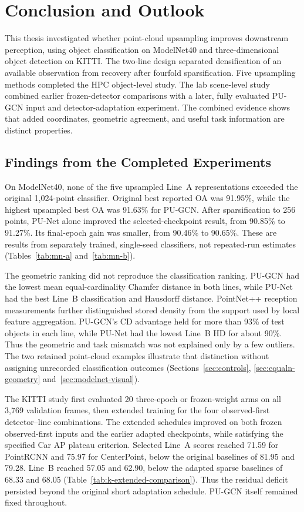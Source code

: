 \chapter{Conclusion and Outlook}\label{chap:conclusion}

This thesis investigated whether point-cloud upsampling improves downstream
perception, using object classification on ModelNet40 and three-dimensional
object detection on KITTI. The two-line design separated densification of
an available observation from recovery after fourfold sparsification.
Five upsampling methods completed the HPC object-level study. The lab
scene-level study combined earlier frozen-detector comparisons with a
later, fully evaluated PU-GCN input and detector-adaptation experiment.
The combined evidence shows that added coordinates, geometric agreement,
and useful task information are distinct properties.

\section{Findings from the Completed Experiments}

On ModelNet40, none of the five upsampled Line~A representations exceeded
the original 1,024-point classifier. Original best reported OA was 91.95\%, while
the highest upsampled best OA was 91.63\% for PU-GCN. After sparsification
to 256 points, PU-Net alone improved the selected-checkpoint result,
from 90.85\% to 91.27\%. Its final-epoch gain was smaller, from 90.46\%
to 90.65\%. These are results from separately trained, single-seed
classifiers, not repeated-run estimates
(Tables~\ref{tab:mn-a} and~\ref{tab:mn-b}).

The geometric ranking did not reproduce the classification ranking.
PU-GCN had the lowest mean equal-cardinality Chamfer distance in both
lines, while PU-Net had the best Line~B classification and Hausdorff
distance. PointNet++ reception measurements further distinguished
stored density from the support used by local feature aggregation.
PU-GCN's CD advantage held for more than 93\% of test objects in
each line, while PU-Net had the lowest Line~B HD for about 90\%.
Thus the geometric and task mismatch was not explained only by a few
outliers. The two retained point-cloud examples illustrate that
distinction without assigning unrecorded classification outcomes
(Sections~\ref{sec:controls}, \ref{sec:equaln-geometry}
and~\ref{sec:modelnet-visual}).

The KITTI study first evaluated 20 three-epoch or frozen-weight arms
on all 3,769 validation frames, then extended training for the four
observed-first detector--line combinations. The extended schedules
improved on both frozen observed-first inputs and the earlier adapted
checkpoints, while satisfying the specified Car AP plateau criterion.
Selected Line~A scores reached 71.59 for PointRCNN and 75.97 for
CenterPoint, below the original baselines of 81.95 and 79.28.
Line~B reached 57.05 and 62.90, below the adapted sparse baselines of
68.33 and 68.05 (Table~\ref{tab:k-extended-comparison}).
Thus the residual deficit persisted beyond the original short
adaptation schedule. PU-GCN itself remained fixed throughout.

